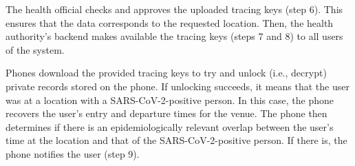 The health official checks and approves the uploaded tracing keys (step 6). This ensures that the data corresponds to the requested location. Then, the health authority’s backend makes available the tracing keys (steps 7 and 8) to all users of the system. 

Phones download the provided tracing keys to try and unlock (i.e., decrypt) private records stored on the phone. If unlocking succeeds, it means that the user was at a location with a SARS-CoV-2-positive person. In this case, the phone recovers the user's entry and departure times for the venue. The phone then determines if there is an epidemiologically relevant overlap between the user’s time at the location and that of the SARS-CoV-2-positive person. If there is, the phone notifies the user (step 9).
